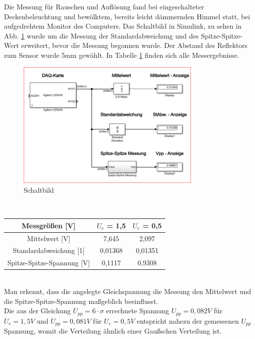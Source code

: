 Die Messung für Rauschen und Auflösung fand bei eingeschalteter Deckenbeleuchtung und bewölktem, bereits leicht dämmernden Himmel statt, bei aufgedrehtem Monitor des Computers. Das Schaltbild in Simulink, zu sehen in Abb. \ref{fg:schalt_rauschen} wurde um die Messung der Standardabweichung und des Spitze-Spitze-Wert erweitert, bevor die Messung begonnen wurde. Der Abstand des Reflektors zum Sensor wurde  5mm gewählt. In Tabelle \ref{tb:messerg} finden sich alle Messergebnisse.
\begin{figure}[h]
	\centering
	\includegraphics[width=0.8\textwidth]{./img/6_3_3}
	\caption{Schaltbild}
	\label{fg:schalt_rauschen}
\end{figure}
~\\
\begin{table}[!h]
	\centering
	\begin{tabular}{|c|c|c|}
	\hline 
	Messgrößen [V]			& $U_e$ = 1,5		& $U_e$ = 0,5 	\\ 
	\hline 
	Mittelwert [V]			& 7,645			& 2,097	\\ 
	\hline 
	Standardabweichung [1]		& 0,01368			& 0,01351	\\ 
	\hline 
	Spitze-Spitze-Spannung [V]	& 0,1117			& 0,9308	\\ 
	\hline 
	\end{tabular}
	\label{tb:messerg}
\end{table}
~\\
Man erkennt, dass die angelegte Gleichspannung die Messung den Mittelwert und die Spitze-Spitze-Spannung maßgeblich beeinflusst.
~\\
Die aus der Gleichung $U_{pp} = 6 \cdot \sigma$ errechnete Spannung $U_{pp} = 0,082V$ für $U_e = 1,5V$ und $U_{pp} = 0,081V$ für $U_e = 0,5V$ entspricht nahezu der gemessenen $U_{pp}$ Spannung, womit die Verteilung ähnlich einer Gaußschen Verteilung ist.
